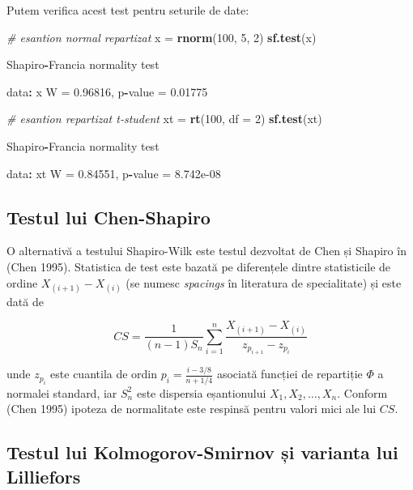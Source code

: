 \documentclass[]{article}
\newenvironment{Shaded}{\begin{snugshade}}{\end{snugshade}}
\newcommand{\KeywordTok}[1]{\textcolor[rgb]{0.13,0.29,0.53}{\textbf{#1}}}
\newcommand{\DataTypeTok}[1]{\textcolor[rgb]{0.13,0.29,0.53}{#1}}
\newcommand{\DecValTok}[1]{\textcolor[rgb]{0.00,0.00,0.81}{#1}}
\newcommand{\FloatTok}[1]{\textcolor[rgb]{0.00,0.00,0.81}{#1}}
\newcommand{\StringTok}[1]{\textcolor[rgb]{0.31,0.60,0.02}{#1}}
\newcommand{\CommentTok}[1]{\textcolor[rgb]{0.56,0.35,0.01}{\textit{#1}}}
\newcommand{\OperatorTok}[1]{\textcolor[rgb]{0.81,0.36,0.00}{\textbf{#1}}}
\newcommand{\NormalTok}[1]{#1}
\begin{document}
Putem verifica acest test pentru seturile de date:

\begin{Shaded}
\begin{Highlighting}[]
\CommentTok{# esantion normal repartizat }
\NormalTok{x =}\StringTok{ }\KeywordTok{rnorm}\NormalTok{(}\DecValTok{100}\NormalTok{, }\DecValTok{5}\NormalTok{, }\DecValTok{2}\NormalTok{)}
\KeywordTok{sf.test}\NormalTok{(x)}

\NormalTok{    Shapiro}\OperatorTok{-}\NormalTok{Francia normality test}

\NormalTok{data}\OperatorTok{:}\StringTok{  }\NormalTok{x}
\NormalTok{W =}\StringTok{ }\FloatTok{0.96816}\NormalTok{, p}\OperatorTok{-}\NormalTok{value =}\StringTok{ }\FloatTok{0.01775}

\CommentTok{# esantion repartizat t-student}
\NormalTok{xt =}\StringTok{ }\KeywordTok{rt}\NormalTok{(}\DecValTok{100}\NormalTok{, }\DataTypeTok{df =} \DecValTok{2}\NormalTok{)}
\KeywordTok{sf.test}\NormalTok{(xt)}

\NormalTok{    Shapiro}\OperatorTok{-}\NormalTok{Francia normality test}

\NormalTok{data}\OperatorTok{:}\StringTok{  }\NormalTok{xt}
\NormalTok{W =}\StringTok{ }\FloatTok{0.84551}\NormalTok{, p}\OperatorTok{-}\NormalTok{value =}\StringTok{ }\FloatTok{8.742e-08}
\end{Highlighting}
\end{Shaded}

\subsection{Testul lui Chen-Shapiro}\label{testul-lui-chen-shapiro}

O alternativă a testului Shapiro-Wilk este testul dezvoltat de Chen și
Shapiro în (Chen 1995). Statistica de test este bazată pe diferențele
dintre statisticile de ordine \(X_{(i+1)} - X_{(i)}\) (se numesc
\emph{spacings} în literatura de specialitate) și este dată de

\[
  CS = \frac{1}{(n-1)S_n}\sum_{i = 1}^{n}\frac{X_{(i+1)} - X_{(i)}}{z_{p_{i+1}} - z_{p_i}}
\]

unde \(z_{p_i}\) este cuantila de ordin
\(p_i = \frac{i - 3/8}{n + 1/4}\) asociată funcției de repartiție
\(\Phi\) a normalei standard, iar \(S_n^2\) este dispersia eșantionului
\(X_1, X_2, \ldots, X_n\). Conform (Chen 1995) ipoteza de normalitate
este respinsă pentru valori mici ale lui \(CS\).

\subsection{Testul lui Kolmogorov-Smirnov și varianta lui
Lilliefors}\label{testul-lui-kolmogorov-smirnov-si-varianta-lui-lilliefors}
\end{document}
